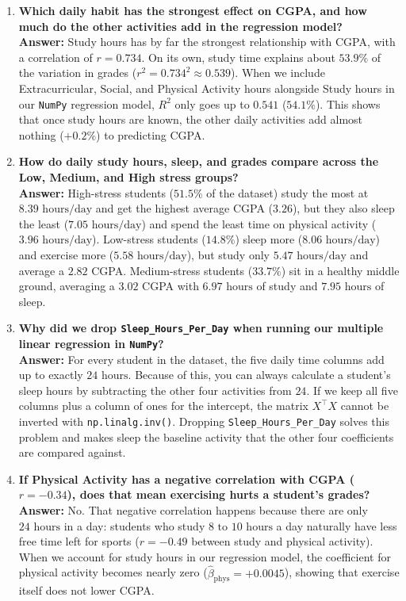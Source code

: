 \documentclass[11pt,a4paper]{article}
\begin{document}
\begin{enumerate}\setlength{\itemsep}{4pt}\setlength{\parskip}{1pt}\setlength{\topsep}{2pt}
    \item \textbf{Which daily habit has the strongest effect on CGPA, and how much do the other activities add in the regression model?}\\
    \textbf{Answer:} Study hours has by far the strongest relationship with CGPA, with a correlation of $r = 0.734$. On its own, study time explains about $53.9\%$ of the variation in grades ($r^2 = 0.734^2 \approx 0.539$). When we include Extracurricular, Social, and Physical Activity hours alongside Study hours in our \texttt{NumPy} regression model, $R^2$ only goes up to $0.541$ ($54.1\%$). This shows that once study hours are known, the other daily activities add almost nothing ($+0.2\%$) to predicting CGPA.

    \item \textbf{How do daily study hours, sleep, and grades compare across the Low, Medium, and High stress groups?}\\
    \textbf{Answer:} High-stress students ($51.5\%$ of the dataset) study the most at $8.39\text{ hours/day}$ and get the highest average CGPA ($3.26$), but they also sleep the least ($7.05\text{ hours/day}$) and spend the least time on physical activity ($3.96\text{ hours/day}$). Low-stress students ($14.8\%$) sleep more ($8.06\text{ hours/day}$) and exercise more ($5.58\text{ hours/day}$), but study only $5.47\text{ hours/day}$ and average a $2.82$ CGPA. Medium-stress students ($33.7\%$) sit in a healthy middle ground, averaging a $3.02$ CGPA with $6.97\text{ hours}$ of study and $7.95\text{ hours}$ of sleep.

    \item \textbf{Why did we drop \texttt{Sleep\_Hours\_Per\_Day} when running our multiple linear regression in \texttt{NumPy}?}\\
    \textbf{Answer:} For every student in the dataset, the five daily time columns add up to exactly $24\text{ hours}$. Because of this, you can always calculate a student's sleep hours by subtracting the other four activities from $24$. If we keep all five columns plus a column of ones for the intercept, the matrix $X^\top X$ cannot be inverted with \texttt{np.linalg.inv()}. Dropping \texttt{Sleep\_Hours\_Per\_Day} solves this problem and makes sleep the baseline activity that the other four coefficients are compared against.

    \item \textbf{If Physical Activity has a negative correlation with CGPA ($r = -0.34$), does that mean exercising hurts a student's grades?}\\
    \textbf{Answer:} No. That negative correlation happens because there are only $24\text{ hours}$ in a day: students who study $8\text{ to }10\text{ hours}$ a day naturally have less free time left for sports ($r = -0.49$ between study and physical activity). When we account for study hours in our regression model, the coefficient for physical activity becomes nearly zero ($\hat{\beta}_{\text{phys}} = +0.0045$), showing that exercise itself does not lower CGPA.


\end{enumerate}
\end{document}
